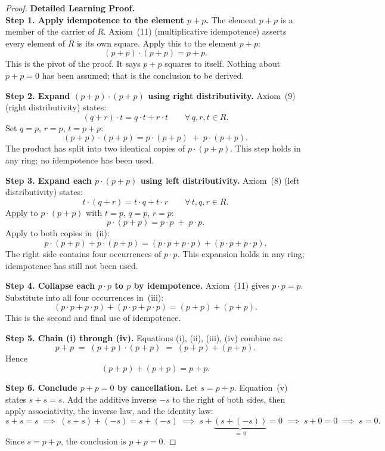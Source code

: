 \begin{proof}
\textbf{Detailed Learning Proof.}~\\

\textbf{Step 1. Apply idempotence to the element $p + p$.}
The element $p + p$ is a member of the carrier of $R$.
Axiom~(11) (multiplicative idempotence) asserts every element
of $R$ is its own square.
Apply this to the element $p + p$:
\[
(p + p) \cdot (p + p) = p + p. \tag{i}
\]
This is the pivot of the proof.
It says $p + p$ squares to itself.
Nothing about $p + p = 0$ has been assumed;
that is the conclusion to be derived.

\textbf{Step 2. Expand $(p+p)\cdot(p+p)$ using right distributivity.}
Axiom~(9) (right distributivity) states:
\[
(q + r) \cdot t = q \cdot t + r \cdot t
\qquad \forall\, q, r, t \in R.
\]
Set $q = p$, $r = p$, $t = p + p$:
\[
(p + p) \cdot (p + p) = p \cdot (p + p) \;+\; p \cdot (p + p). \tag{ii}
\]
The product has split into two identical copies of $p \cdot (p+p)$.
This step holds in any ring; no idempotence has been used.

\textbf{Step 3. Expand each $p\cdot(p+p)$ using left distributivity.}
Axiom~(8) (left distributivity) states:
\[
t \cdot (q + r) = t \cdot q + t \cdot r
\qquad \forall\, t, q, r \in R.
\]
Apply to $p \cdot (p + p)$ with $t = p$, $q = p$, $r = p$:
\[
p \cdot (p + p) = p \cdot p \;+\; p \cdot p.
\]
Apply to both copies in~(ii):
\[
p \cdot (p+p) + p \cdot (p+p)
= (p \cdot p + p \cdot p) + (p \cdot p + p \cdot p). \tag{iii}
\]
The right side contains four occurrences of $p \cdot p$.
This expansion holds in any ring; idempotence has still not
been used.

\textbf{Step 4. Collapse each $p \cdot p$ to $p$ by idempotence.}
Axiom~(11) gives $p \cdot p = p$.
Substitute into all four occurrences in~(iii):
\[
(p \cdot p + p \cdot p) + (p \cdot p + p \cdot p)
= (p + p) + (p + p). \tag{iv}
\]
This is the second and final use of idempotence.

\textbf{Step 5. Chain (i) through (iv).}
Equations (i), (ii), (iii), (iv) combine as:
\[
p + p
\;=\; (p+p)\cdot(p+p)
\;=\; (p+p)+(p+p).
\]
Hence
\[
(p+p) + (p+p) = p+p. \tag{v}
\]

\textbf{Step 6. Conclude $p + p = 0$ by cancellation.}
Let $s = p + p$.
Equation~(v) states $s + s = s$.
Add the additive inverse $-s$ to the right of both sides,
then apply associativity, the inverse law, and the identity law:
\[
s + s = s
\;\implies\; (s + s) + (-s) = s + (-s)
\;\implies\; s + \underbrace{(s + (-s))}_{=\,0} = 0
\;\implies\; s + 0 = 0
\;\implies\; s = 0.
\]
Since $s = p + p$, the conclusion is $p + p = 0$.
\end{proof}

